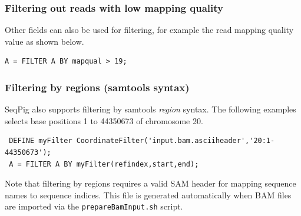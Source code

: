 \subsubsection{Filtering out reads with low mapping quality}

Other fields can also be used for filtering, for example the read
mapping quality value as shown below.
\begin{lstlisting}
A = FILTER A BY mapqual > 19;
\end{lstlisting}

\subsubsection{Filtering by regions (samtools syntax)}

SeqPig also supports filtering by samtools \emph{region} syntax.
The following examples selects base positions 1 to 44350673
of chromosome 20.
\begin{lstlisting}
 DEFINE myFilter CoordinateFilter('input.bam.asciiheader','20:1-44350673');
 A = FILTER A BY myFilter(refindex,start,end);
\end{lstlisting}
Note that filtering by regions requires a valid SAM header for mapping
sequence names to sequence indices. This file is generated automatically
when BAM files are imported via the {\tt prepareBamInput.sh} script.

